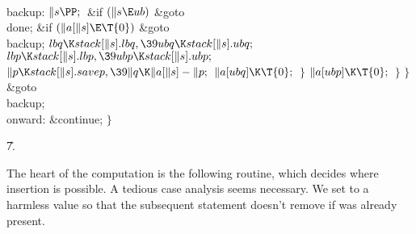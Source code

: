 \4\\{backup}:\5
${}\|s\PP;{}$\6
\&{if} ${}(\|s\E\\{ub}){}$\1\5
\&{goto} \\{done};\2\6
\&{if} ${}(\|a[\|s]\E\T{0}){}$\1\5
\&{goto} \\{backup};\2\6
${}\\{lbq}\K\\{stack}[\|s].\\{lbq},\39\\{ubq}\K\\{stack}[\|s].\\{ubq};{}$\6
${}\\{lbp}\K\\{stack}[\|s].\\{lbp},\39\\{ubp}\K\\{stack}[\|s].\\{ubp};{}$\6
${}\|p\K\\{stack}[\|s].\\{savep},\39\|q\K\|a[\|s]-\|p;{}$\6
${}\|a[\\{ubq}]\K\T{0};{}$\6
\4${}\}{}$\2\6
${}\|a[\\{ubp}]\K\T{0};{}$\6
\4${}\}{}$\2\6
\4${}\}{}$\2\6
\&{goto} \\{backup};\6
\4\\{onward}:\5
\&{continue};\6
\4${}\}{}$\2\2\par
\U7.\fi

The heart of the computation is the following routine,
which decides
where insertion is possible. A tedious case analysis seems necessary.
We set  to a harmless value so that the subsequent statement
 doesn't remove  if  was already
present.

